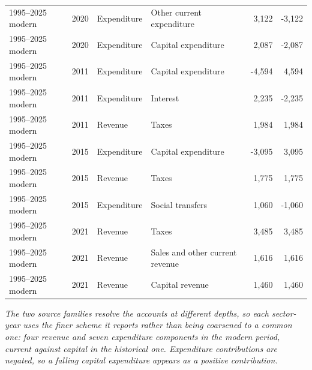 \begin{table}[htbp]
{\begin{tabular}{@{}lrllrr@{}}
1995--2025 modern & 2020 & Expenditure & Other current expenditure & 3,122 & -3,122 \\
1995--2025 modern & 2020 & Expenditure & Capital expenditure & 2,087 & -2,087 \\
1995--2025 modern & 2011 & Expenditure & Capital expenditure & -4,594 & 4,594 \\
1995--2025 modern & 2011 & Expenditure & Interest & 2,235 & -2,235 \\
1995--2025 modern & 2011 & Revenue & Taxes & 1,984 & 1,984 \\
1995--2025 modern & 2015 & Expenditure & Capital expenditure & -3,095 & 3,095 \\
1995--2025 modern & 2015 & Revenue & Taxes & 1,775 & 1,775 \\
1995--2025 modern & 2015 & Expenditure & Social transfers & 1,060 & -1,060 \\
1995--2025 modern & 2021 & Revenue & Taxes & 3,485 & 3,485 \\
1995--2025 modern & 2021 & Revenue & Sales and other current revenue & 1,616 & 1,616 \\
1995--2025 modern & 2021 & Revenue & Capital revenue & 1,460 & 1,460 \\
\bottomrule
\end{tabular}%
}
\par\smallskip
\begin{minipage}{\linewidth}\footnotesize\itshape The two source families resolve the accounts at different depths, so each sector-year uses the finer scheme it reports rather than being coarsened to a common one: four revenue and seven expenditure components in the modern period, current against capital in the historical one. Expenditure contributions are negated, so a falling capital expenditure appears as a positive contribution.\end{minipage}
\end{table}
